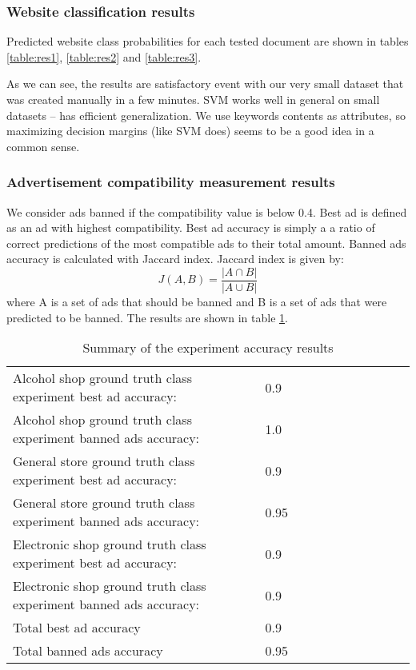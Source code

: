\documentclass[a4paper]{article}
\begin{document}
\subsubsection {Website classification results}
Predicted website class probabilities for each tested document are shown in
tables
\ref{table:res1},
\ref{table:res2} and
\ref{table:res3}.

As we can see, the results are satisfactory event with our very small dataset
that was created manually in a few minutes.
SVM works well in general on small datasets -- has efficient generalization.
We use keywords contents as attributes, so maximizing decision margins (like SVM does)
seems to be a good idea in a common sense.

\subsubsection {Advertisement compatibility measurement results}
\label{benchCompat}
We consider ads banned if the compatibility value is below 0.4.
Best ad is defined as an ad with highest compatibility.
Best ad accuracy is simply a a ratio of correct predictions
of the most compatible ads to their total amount.
Banned ads accuracy is calculated with Jaccard index.
Jaccard index is given by:
\begin{equation}
    J(A,B) = \frac{|A\cap B|}{|A\cup B|}
\end{equation}
where A is a set of ads that should be banned and B is a set of ads that were predicted to be banned.
The results are shown in table \ref{table:testResults}.


\begin{table}[!hbt]
    \caption{ Summary of the experiment accuracy results
    \label{table:testResults}
    }
\footnotesize
\begin{center}
    \begin{tabular}{|l|l|l|l|l|l|l|l|l|l|l|}
    \hline
        Alcohol shop ground truth class experiment best ad accuracy:  &
        0.9 \\
        Alcohol shop ground truth class experiment banned ads accuracy: &
        1.0 \\
    \hline
        General store ground truth class experiment best ad accuracy: &
        0.9 \\
        General store ground truth class experiment banned ads accuracy: &
        0.95 \\
    \hline
        Electronic shop ground truth class experiment best ad accuracy: &
        0.9 \\
        Electronic shop ground truth class experiment banned ads accuracy: &
        0.9 \\
    \hline
        Total best ad accuracy & 0.9 \\
        Total banned ads accuracy & 0.95 \\
    \hline
    \end{tabular}
\end{center}
\end{table}
\end{document}
